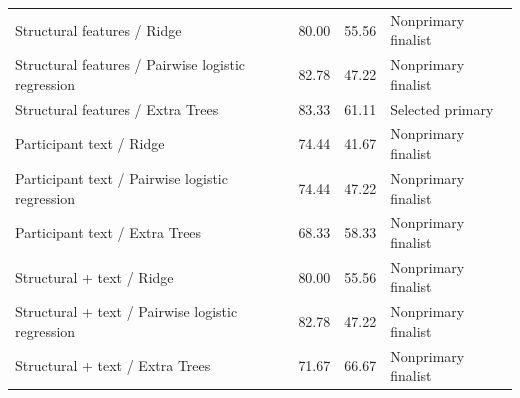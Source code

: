 \documentclass[journal]{IEEEtran}
\begin{document}
\begin{table}[t]
\begin{tabular}{p{}p{}p{}p{}}
{\raggedright Structural features / Ridge\par} & {\raggedright 80.00\par} & {\raggedright 55.56\par} & {\raggedright Nonprimary finalist\par} \\
{\raggedright Structural features / Pairwise logistic regression\par} & {\raggedright 82.78\par} & {\raggedright 47.22\par} & {\raggedright Nonprimary finalist\par} \\
{\raggedright Structural features / Extra Trees\par} & {\raggedright 83.33\par} & {\raggedright 61.11\par} & {\raggedright Selected primary\par} \\
{\raggedright Participant text / Ridge\par} & {\raggedright 74.44\par} & {\raggedright 41.67\par} & {\raggedright Nonprimary finalist\par} \\
{\raggedright Participant text / Pairwise logistic regression\par} & {\raggedright 74.44\par} & {\raggedright 47.22\par} & {\raggedright Nonprimary finalist\par} \\
{\raggedright Participant text / Extra Trees\par} & {\raggedright 68.33\par} & {\raggedright 58.33\par} & {\raggedright Nonprimary finalist\par} \\
{\raggedright Structural + text / Ridge\par} & {\raggedright 80.00\par} & {\raggedright 55.56\par} & {\raggedright Nonprimary finalist\par} \\
{\raggedright Structural + text / Pairwise logistic regression\par} & {\raggedright 82.78\par} & {\raggedright 47.22\par} & {\raggedright Nonprimary finalist\par} \\
{\raggedright Structural + text / Extra Trees\par} & {\raggedright 71.67\par} & {\raggedright 66.67\par} & {\raggedright Nonprimary finalist\par} \\
\bottomrule
\end{tabular}
\end{table}
\end{document}
